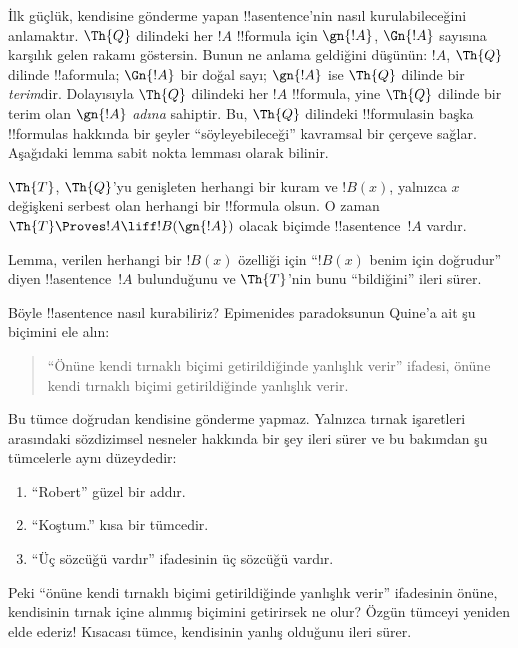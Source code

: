 \documentclass[../../../include/open-logic-section]{subfiles}
\begin{document}
İlk güçlük, kendisine gönderme yapan !!a{sentence}'nin nasıl kurulabileceğini
anlamaktır. $\Th{Q}$ dilindeki her $!A$ !!{formula} için $\gn{!A}$,
$\Gn{!A}$ sayısına karşılık gelen rakamı göstersin. Bunun ne anlama geldiğini
düşünün: $!A$, $\Th{Q}$ dilinde !!a{formula}; $\Gn{!A}$ bir doğal sayı;
$\gn{!A}$ ise $\Th{Q}$ dilinde bir \emph{terim}dir. Dolayısıyla $\Th{Q}$
dilindeki her $!A$ !!{formula}, yine $\Th{Q}$ dilinde bir terim olan
$\gn{!A}$ \emph{adına} sahiptir. Bu, $\Th{Q}$ dilindeki !!{formula}s{}in başka
!!{formula}s hakkında bir şeyler ``söyleyebileceği'' kavramsal bir çerçeve
sağlar. Aşağıdaki lemma sabit nokta lemması olarak bilinir.

\begin{lem}
$\Th{T}$, $\Th{Q}$'yu genişleten herhangi bir kuram ve $!B(x)$, yalnızca
$x$ değişkeni serbest olan herhangi bir !!{formula} olsun. O zaman
$\Th{T} \Proves !A \liff !B(\gn{!A})$ olacak biçimde !!a{sentence}~$!A$
vardır.
\end{lem}

Lemma, verilen herhangi bir $!B(x)$ özelliği için ``$!B(x)$ benim için
doğrudur'' diyen !!a{sentence}~$!A$ bulunduğunu ve $\Th{T}$'nin bunu
``bildiğini'' ileri sürer.

Böyle !!a{sentence} nasıl kurabiliriz? Epimenides paradoksunun Quine'a ait şu
biçimini ele alın:
\begin{quote}
``Önüne kendi tırnaklı biçimi getirildiğinde yanlışlık verir'' ifadesi,
önüne kendi tırnaklı biçimi getirildiğinde yanlışlık verir.
\end{quote}
Bu tümce doğrudan kendisine gönderme yapmaz. Yalnızca tırnak işaretleri
arasındaki sözdizimsel nesneler hakkında bir şey ileri sürer ve bu bakımdan
şu tümcelerle aynı düzeydedir:
\begin{enumerate}
\item ``Robert'' güzel bir addır.
\item ``Koştum.'' kısa bir tümcedir.
\item ``Üç sözcüğü vardır'' ifadesinin üç sözcüğü vardır.
\end{enumerate}
Peki ``önüne kendi tırnaklı biçimi getirildiğinde yanlışlık verir'' ifadesinin
önüne, kendisinin tırnak içine alınmış biçimini getirirsek ne olur? Özgün
tümceyi yeniden elde ederiz!{} Kısacası tümce, kendisinin yanlış olduğunu
ileri sürer.
\end{document}
